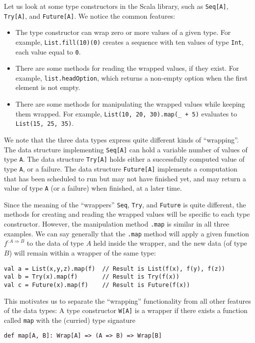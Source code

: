 Let us look at some type constructors in the Scala library, such as
\lstinline!Seq[A]!, \lstinline!Try[A]!, and \lstinline!Future[A]!.
We notice the common features:
\begin{itemize}
\item The type constructor can wrap zero or more values of a given type.
For example, \lstinline!List.fill(10)(0)! creates a sequence with
ten values of type \lstinline!Int!, each value equal to \lstinline!0!.
\item There are some methods for reading the wrapped values, if they exist.
For example, \lstinline!list.headOption!, which returns a non-empty
option when the first element is not empty.
\item There are some methods for manipulating the wrapped values while keeping
them wrapped. For example, \lstinline!List(10, 20, 30).map(_ + 5)!
evaluates to \lstinline!List(15, 25, 35)!.
\end{itemize}
We note that the three data types express quite different kinds of
``wrapping''. The data structure implementing \lstinline!Seq[A]!
can hold a variable number of values of type \lstinline!A!. The data
structure \lstinline!Try[A]! holds either a successfully computed
value of type \lstinline!A!, or a failure. The data structure \lstinline!Future[A]!
implements a computation that has been scheduled to run but may not
have finished yet, and may return a value of type \lstinline!A! (or
a failure) when finished, at a later time.

Since the meaning of the ``wrappers'' \lstinline!Seq!, \lstinline!Try!,
and \lstinline!Future! is quite different, the methods for creating
and reading the wrapped values will be specific to each type constructor.
However, the manipulation method \lstinline!.map! is similar in all
three examples. We can say generally that the \lstinline!.map! method
will apply a given function $f^{:A\Rightarrow B}$ to the data of
type $A$ held inside the wrapper, and the new data (of type $B$)
will remain within a wrapper of the same type: 
\begin{lstlisting}
val a = List(x,y,z).map(f)  // Result is List(f(x), f(y), f(z))
val b = Try(x).map(f)       // Result is Try(f(x))
val c = Future(x).map(f)    // Result is Future(f(x))
\end{lstlisting}

This motivates us to separate the ``wrapping'' functionality from
all other features of the data types: A type constructor \lstinline!W[A]!
is a wrapper if there exists a function called \lstinline!map! with
the (curried) type signature
\begin{lstlisting}
def map[A, B]: Wrap[A] => (A => B) => Wrap[B]
\end{lstlisting}

